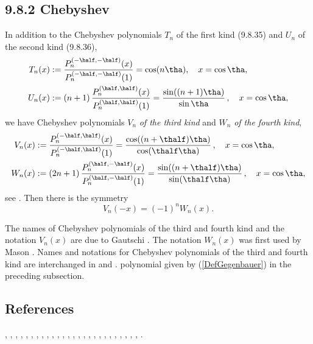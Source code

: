 \documentclass[envcountchap,graybox]{svmono}
\begin{document}
\subsection*{9.8.2 Chebyshev}
\label{sec9.8.2}
In addition to the Chebyshev polynomials $T_n$ of the first kind (9.8.35)
and $U_n$ of the second kind (9.8.36),
\begin{align}
T_n(x)&:=\frac{P_n^{(-\half,-\half)}(x)}{P_n^{(-\half,-\half)}(1)}
=\cos(n\tha),\quad x=\cos\tha,\\
U_n(x)&:=(n+1)\,\frac{P_n^{(\half,\half)}(x)}{P_n^{(\half,\half)}(1)}
=\frac{\sin((n+1)\tha)}{\sin\tha}\,,\quad x=\cos\tha,
\end{align}
we have Chebyshev polynomials $V_n$ {\em of the third kind}
and $W_n$ {\em of the fourth kind},
\begin{align}
V_n(x)&:=\frac{P_n^{(-\half,\half)}(x)}{P_n^{(-\half,\half)}(1)}
=\frac{\cos((n+\thalf)\tha)}{\cos(\thalf\tha)}\,,\quad x=\cos\tha,\\
W_n(x)&:=(2n+1)\,\frac{P_n^{(\half,-\half)}(x)}{P_n^{(\half,-\half)}(1)}
=\frac{\sin((n+\thalf)\tha)}{\sin(\thalf\tha)}\,,\quad x=\cos\tha,
\end{align}
see \cite[Section 1.2.3]{K20}. Then there is the symmetry
\begin{equation}
V_n(-x)=(-1)^n W_n(x).
\label{140}
\end{equation}

The names of Chebyshev polynomials of the third and fourth kind
and the notation $V_n(x)$ are due to Gautschi \cite{K21}.
The notation $W_n(x)$ was first used by Mason \cite{K22}.
Names and notations for Chebyshev polynomials of the third and fourth
kind are interchanged in  and
.
polynomial given by (\ref{DefGegenbauer}) in the preceding subsection.

\subsection*{References}
\cite{Abram}, \cite{AskeyFitch}, \cite{AskeyGasperHarris}, \cite{AskeyIsmail76},
\cite{Bavinck95}, \cite{Chihara78}, \cite{Danese}, \cite{DilcherStolarsky},
\cite{Erdelyi+}, \cite{Grad}, \cite{HartmannStephan}, \cite{Ismail2005II}, \cite{Koekoek2000},
\cite{Luke}, \cite{Mathai}, \cite{Nikiforov+}, \cite{NikiforovUvarov}, \cite{Rainville},
\cite{Rayes+}, \cite{Rivlin}, \cite{SainteViennot}, \cite{Szego75}, \cite{Temme},
\cite{Wilson70I}, \cite{Zayed}, \cite{Zhang}, \cite{ZhangWang}.
\end{document}

